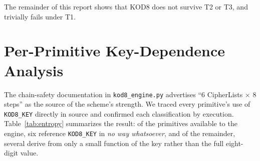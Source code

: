 \documentclass[11pt]{article}
\begin{document}
The remainder of this report shows that KOD8 does not survive T2 or T3,
and trivially fails under T1.

\section{Per-Primitive Key-Dependence Analysis}
\label{sec:entropy}

The chain-safety documentation in \texttt{kod8\_engine.py} advertises
``6 CipherLists $\times$ 8 steps'' as the source of the scheme's
strength. We traced every primitive's use of \texttt{KOD8\_KEY} directly
in source and confirmed each classification by execution. Table~\ref{tab:entropy}
summarizes the result: of the primitives available to the engine, six
reference \texttt{KOD8\_KEY} in \emph{no way whatsoever}, and of the
remainder, several derive from only a small function of the key rather
than the full eight-digit value.
\end{document}
